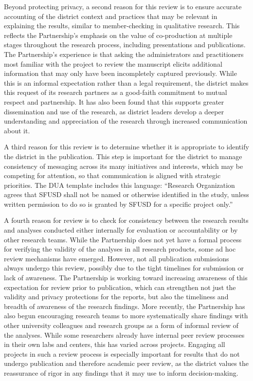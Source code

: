 \documentclass[
]{WileySix}
\begin{document}
Beyond protecting privacy, a second reason for this review is to ensure accurate accounting of the district context and practices that may be relevant in explaining the results, similar to member-checking in qualitative research. This reflects the Partnership's emphasis on the value of co-production at multiple stages throughout the research process, including presentations and publications. The Partnership's experience is that asking the administrators and practitioners most familiar with the project to review the manuscript elicits additional information that may only have been incompletely captured previously. While this is an informal expectation rather than a legal requirement, the district makes this request of its research partners as a good-faith commitment to mutual respect and partnership. It has also been found that this supports greater dissemination and use of the research, as district leaders develop a deeper understanding and appreciation of the research through increased communication about it.

A third reason for this review is to determine whether it is appropriate to identify the district in the publication. This step is important for the district to manage consistency of messaging across its many initiatives and interests, which may be competing for attention, so that communication is aligned with strategic priorities. The DUA template includes this language: ``Research Organization agrees that SFUSD shall not be named or otherwise identified in the study, unless written permission to do so is granted by SFUSD for a specific project only.''

A fourth reason for review is to check for consistency between the research results and analyses conducted either internally for evaluation or accountability or by other research teams. While the Partnership does not yet have a formal process for verifying the validity of the analyses in all research products, some ad hoc review mechanisms have emerged. However, not all publication submissions always undergo this review, possibly due to the tight timelines for submission or lack of awareness. The Partnership is working toward increasing awareness of this expectation for review prior to publication, which can strengthen not just the validity and privacy protections for the reports, but also the timeliness and breadth of awareness of the research findings. More recently, the Partnership has also begun encouraging research teams to more systematically share findings with other university colleagues and research groups as a form of informal review of the analyses. While some researchers already have internal peer review processes in their own labs and centers, this has varied across projects. Engaging all projects in such a review process is especially important for results that do not undergo publication and therefore academic peer review, as the district values the reassurance of rigor in any findings that it may use to inform decision-making.
\end{document}

